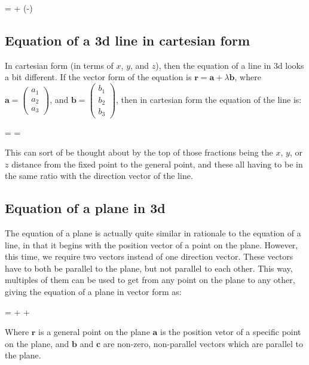\begin{ea}
	 =  + \lambda(-)
\end{ea}

\subsection{Equation of a 3d line in cartesian form}
In cartesian form (in terms of $x$, $y$, and $z$), then the equation of a line in 3d looks a bit different. If the vector form of the equation is $\mathbf{r} = \mathbf{a}+\lambda \mathbf{b}$, where $\mathbf{a}=\begin{pmatrix}a_1\\a_2\\a_3\end{pmatrix}$, and $\mathbf{b}=\begin{pmatrix}b_1\\b_2\\b_3\end{pmatrix}$, then in cartesian form the equation of the line is:

\begin{ea}
	 =  = 
\end{ea}

This can sort of be thought about by the top of those fractions being the $x$, $y$, or $z$ distance from the fixed point to the general point, and these all having to be in the same ratio with the direction vector of the line.

\subsection{Equation of a plane in 3d}
The equation of a plane is actually quite similar in rationale to the equation of a line, in that it begins with the position vector of a point on the plane. However, this time, we require two vectors instead of one direction vector. These vectors have to both be parallel to the plane, but not parallel to each other. This way, multiples of them can be used to get from any point on the plane to any other, giving the equation of a plane in vector form as:

\begin{ea}
	 =  + \lambda{} + \mu{}
\end{ea}

Where $\mathbf{r}$ is a general point on the plane $\mathbf{a}$ is the position vetor of a specific point on the plane, and $\mathbf{b}$ and $\mathbf{c}$ are non-zero, non-parallel vectors which are parallel to the plane.

